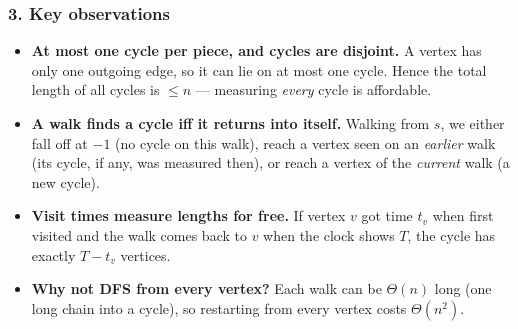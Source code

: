 \begin{diagrambox}
\end{diagrambox}

\subsubsection*{3. Key observations}

\begin{itemize}[leftmargin=*]
    \item \textbf{At most one cycle per piece, and cycles are disjoint.} A vertex has only one outgoing edge, so it can lie on at most one cycle. Hence the total length of all cycles is $\le n$ --- measuring \emph{every} cycle is affordable.
    \item \textbf{A walk finds a cycle iff it returns into itself.} Walking from $s$, we either fall off at $-1$ (no cycle on this walk), reach a vertex seen on an \emph{earlier} walk (its cycle, if any, was measured then), or reach a vertex of the \emph{current} walk (a new cycle).
    \item \textbf{Visit times measure lengths for free.} If vertex $v$ got time $t_v$ when first visited and the walk comes back to $v$ when the clock shows $T$, the cycle has exactly $T - t_v$ vertices.
    \item \textbf{Why not DFS from every vertex?} Each walk can be $\Theta(n)$ long (one long chain into a cycle), so restarting from every vertex costs $\Theta(n^2)$.
\end{itemize}

